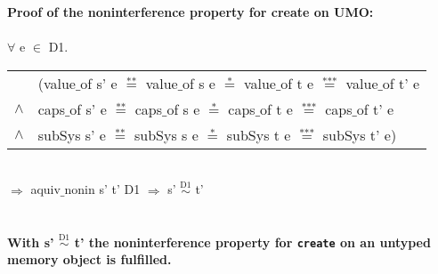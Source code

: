 \textbf{Proof of the noninterference property for create on UMO:} \\ \\
$\forall$ e $\in$ D1. \\ 
\begin{tabular}{ll}
& (value$\_$of s' e $\overset{\text{**}}{=}$ value$\_$of s e $\overset{\text{*}}{=}$ value$\_$of t e $\overset{\text{***}}{=}$ value$\_$of t' e \\
$\wedge$ & caps$\_$of s' e $\overset{\text{**}}{=}$ caps$\_$of s e $\overset{\text{*}}{=}$ caps$\_$of t e $\overset{\text{***}}{=}$ caps$\_$of t' e \\
$\wedge$ & subSys s' e $\overset{\text{**}}{=}$ subSys s e $\overset{\text{*}}{=}$ subSys t e $\overset{\text{***}}{=}$ subSys t' e)
\end{tabular} \\
$\Rightarrow$ aquiv$\_$nonin s' t' D1 $\Rightarrow$ s' $\overset{\text{D1}}{\sim}$ t' \\ \\ \\
\textbf{With s' $\overset{\text{D1}}{\sim}$ t' the noninterference property for \texttt{create} on an untyped memory object is fulfilled.} 
\clearpage
